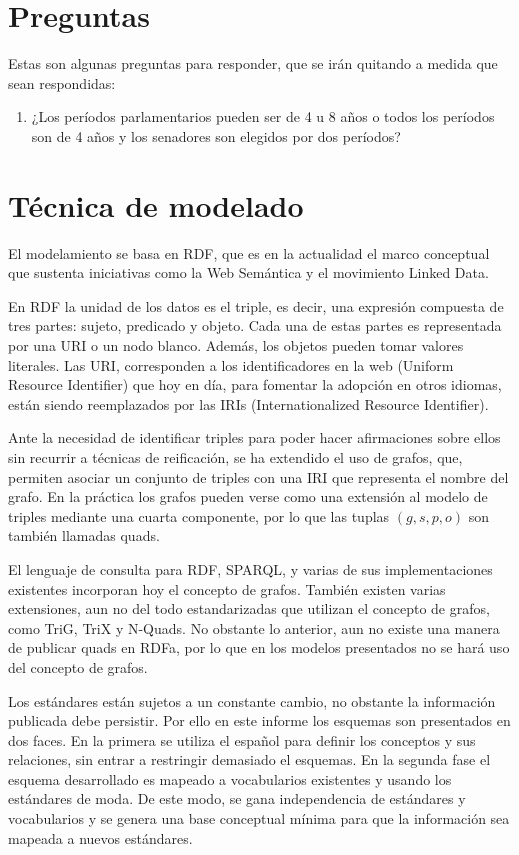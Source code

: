 \documentclass[letterpaper,titlepage]{article}
\begin{document}
\section{Preguntas}

Estas son algunas preguntas para responder, que se irán quitando a
medida que sean respondidas:

\begin{enumerate}
\item ¿Los períodos parlamentarios pueden ser de 4 u 8 años o todos
  los períodos son de 4 años y los senadores son elegidos por dos
  períodos?
\end{enumerate}

\section{Técnica de modelado}
\label{tecnica-de-modelado}

El modelamiento se basa en RDF, que es en la actualidad el marco
conceptual que sustenta iniciativas como la Web Semántica y el
movimiento Linked Data.

En RDF la unidad de los datos es el triple, es decir, una expresión
compuesta de tres partes: sujeto, predicado y objeto. Cada una de
estas partes es representada por una URI o un nodo blanco. Además, los
objetos pueden tomar valores literales. Las URI, corresponden a los
identificadores en la web (Uniform Resource Identifier) que hoy en
día, para fomentar la adopción en otros idiomas, están siendo
reemplazados por las IRIs (Internationalized Resource Identifier).

Ante la necesidad de identificar triples para poder hacer afirmaciones
sobre ellos sin recurrir a técnicas de reificación, se ha extendido el
uso de grafos, que, permiten asociar un conjunto de triples con una
IRI que representa el nombre del grafo. En la práctica los grafos
pueden verse como una extensión al modelo de triples mediante una
cuarta componente, por lo que las tuplas $(g,s,p,o)$ son también
llamadas quads.

El lenguaje de consulta para RDF, SPARQL, y varias de sus
implementaciones existentes incorporan hoy el concepto de
grafos. También existen varias extensiones, aun no del todo
estandarizadas que utilizan el concepto de grafos, como TriG, TriX y
N-Quads. No obstante lo anterior, aun no existe una manera de publicar
quads en RDFa, por lo que en los modelos presentados no se hará uso
del concepto de grafos.

Los estándares están sujetos a un constante cambio, no obstante la
información publicada debe persistir. Por ello en este informe los
esquemas son presentados en dos faces. En la primera se utiliza el
español para definir los conceptos y sus relaciones, sin entrar a
restringir demasiado el esquemas. En la segunda fase el esquema
desarrollado es mapeado a vocabularios existentes y usando los
estándares de moda. De este modo, se gana independencia de estándares
y vocabularios y se genera una base conceptual mínima para que la
información sea mapeada a nuevos estándares.
\end{document}
